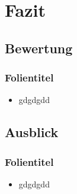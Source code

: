 \section{Fazit}

\subsection{Bewertung}
\begin{frame}\frametitle{Folientitel}
  \begin{itemize}[<+-| alert@+>]
  \item  gdgdgdd
\end{itemize}
\end{frame}

\subsection{Ausblick}
\begin{frame}\frametitle{Folientitel}
  \begin{itemize}[<+-| alert@+>]
  \item  gdgdgdd
\end{itemize}
\end{frame}